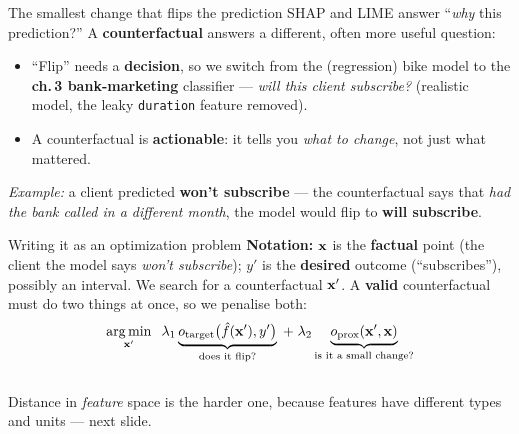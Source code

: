 \documentclass[aspectratio=169]{beamer}
\begin{document}
\begin{frame}{The smallest change that flips the prediction}
  SHAP and LIME answer ``\emph{why} this prediction?'' A \textbf{counterfactual} answers a
  different, often more useful question:
  \vskip 4pt
  \vskip 6pt
  \begin{itemize}\small
    \item ``Flip'' needs a \textbf{decision}, so we switch from the (regression) bike model to
      the \textbf{ch.\,3 bank-marketing} classifier --- \emph{will this client subscribe?}
      (realistic model, the leaky \texttt{duration} feature removed).
    \item A counterfactual is \textbf{actionable}: it tells you \emph{what to change}, not just
      what mattered.
  \end{itemize}
  \vfill
  \footnotesize \textit{Example:} a client predicted \textbf{won't subscribe} --- the
  counterfactual says that \emph{had the bank called in a different month}, the model would flip
  to \textbf{will subscribe}.
\end{frame}

\begin{frame}{Writing it as an optimization problem}
  \textbf{Notation:} $\mathbf{x}$ is the \textbf{factual} point (the client the model says
  \emph{won't subscribe}); $y'$ is the \textbf{desired} outcome (``subscribes''), possibly an
  interval. We search for a counterfactual $\mathbf{x}'$.
  \vskip 4pt
  A \textbf{valid} counterfactual must do two things at once, so we penalise both:
  \[
    \mathop{\mathrm{arg\,min}}_{\mathbf{x}'} \;\;
    \lambda_1 \underbrace{o_{\text{target}}\big(\hat f(\mathbf{x}'), y'\big)}_{\text{does it flip?}}
    \;+\;
    \lambda_2 \underbrace{o_{\text{prox}}(\mathbf{x}', \mathbf{x})}_{\text{is it a small change?}}
  \]
  \begin{columns}[T]
  \end{columns}
  \vskip 4pt
  \footnotesize Distance in \emph{feature} space is the harder one, because features have
  different types and units --- next slide.
\end{frame}
\end{document}
